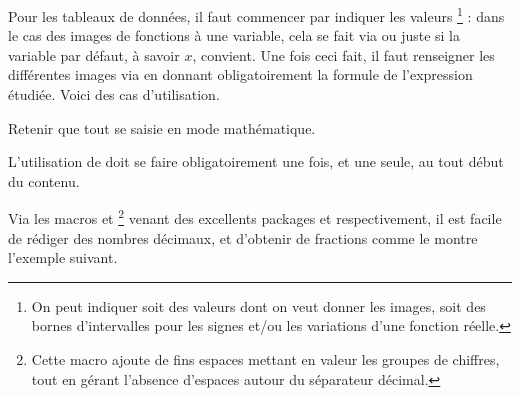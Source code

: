 \documentclass[10pt, a4paper]{article}
\begin{document}
Pour les tableaux de données, il faut commencer par indiquer les valeurs 
\footnote{
	 On peut indiquer soit des valeurs dont on veut donner les images, soit des bornes d'intervalles pour les signes et/ou les variations d'une fonction réelle.
} :
dans le cas des images de fonctions à une variable, cela se fait via
ou juste
si la variable par défaut, à savoir $x$, convient.
Une fois ceci fait, il faut renseigner les différentes images via  en donnant obligatoirement la formule de l'expression étudiée.
Voici des cas d'utilisation.




\begin{tdocexa}
    \leavevmode

\end{tdocexa}


\begin{tdocnote}
	Retenir que tout se saisie en mode mathématique.
\end{tdocnote}


\begin{tdocwarn}
	L'utilisation de  doit se faire obligatoirement une fois, et une seule, au tout début du contenu.
\end{tdocwarn}




\begin{tdocexa}
    \leavevmode

\end{tdocexa}




\begin{tdocexa}
    \leavevmode

\end{tdocexa}



\begin{tdoctip}
%
    Via les macros  et 
    \footnote{
    	Cette macro ajoute de fins espaces mettant en valeur les groupes de chiffres, tout en gérant l'absence d'espaces autour du séparateur décimal.
    }
    venant des excellents packages  et  respectivement, il est facile de rédiger des nombres décimaux, et d'obtenir de  fractions comme le montre l'exemple suivant.

\end{tdoctip}
\end{document}
